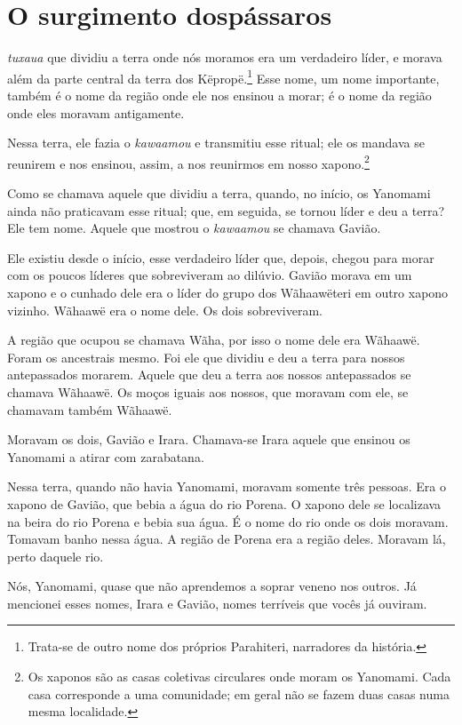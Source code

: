 \chapter[O surgimento dos pássaros]{O surgimento dos\break pássaros}
 
 \textit{tuxaua} que dividiu a terra onde nós moramos era um verdadeiro
líder, e morava além da parte central da terra dos
Këpropë.\footnote{Trata-se de outro nome dos próprios Parahiteri, narradores da história.} Esse nome, um nome importante, também é o nome
da região onde ele nos ensinou a morar; é o nome da região onde eles
moravam antigamente.

Nessa terra, ele fazia o \textit{kawaamou} e transmitiu esse ritual; ele os
mandava se reunirem e nos ensinou, assim, a nos
reunirmos em nosso xapono.\footnote{Os xaponos são as casas coletivas circulares onde moram os Yanomami. Cada casa corresponde a uma comunidade; em geral não se fazem duas casas numa mesma localidade.} 

Como se chamava aquele que dividiu a terra, quando, no início, os
Yanomami ainda não praticavam esse ritual; que, em seguida, se tornou
líder e deu a terra? Ele tem nome. Aquele que mostrou
o \textit{kawaamou} se chamava Gavião.

Ele existiu desde o início, esse verdadeiro líder que, depois, chegou
para morar com os poucos líderes que sobreviveram ao dilúvio. Gavião
morava em um xapono e o cunhado dele era o líder do grupo dos
Wãhaawëteri em outro xapono vizinho. Wãhaawë era o nome
dele. Os dois sobreviveram.

A região que ocupou se chamava Wãha, por isso o nome dele era
Wãhaawë. Foram os ancestrais mesmo. Foi ele que dividiu e deu a terra
para nossos antepassados morarem. Aquele que deu a terra aos nossos
antepassados se chamava Wãhaawë. Os moços iguais aos nossos, que moravam
com ele, se chamavam também Wãhaawë. 

Moravam os dois, Gavião e Irara. Chamava-se Irara aquele que ensinou os
Yanomami a atirar com zarabatana.

Nessa terra, quando não havia Yanomami, moravam somente três pessoas.
Era o xapono de Gavião, que bebia a água do rio Porena. O xapono dele se
localizava na beira do rio Porena e bebia sua água. É o nome do rio onde
os dois moravam. Tomavam banho nessa água. A região de Porena era a região
deles. Moravam lá, perto daquele rio. 

Nós, Yanomami, quase que não aprendemos a soprar veneno nos outros. Já
mencionei esses nomes, Irara e Gavião, nomes terríveis que vocês já
ouviram. 

